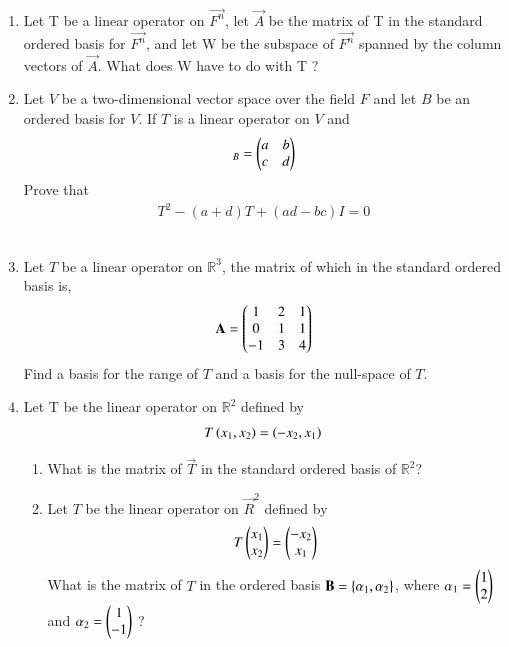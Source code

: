 \begin{enumerate}[label=\thesubsection.\arabic*.,ref=\thesubsection.\theenumi]
\item Let T be a linear operator on $\vec{F^n}$, let $\vec{A}$ be the matrix of T in the standard ordered basis for $\vec{F^n}$, and let W be the subspace of $\vec{F^n}$ spanned by the column vectors of $\vec{A}$. What does W have to do with T ?
%
\\
\solution

%
\item Let $V$ be a two-dimensional vector space over the field $F$ and let $B$ be an ordered basis for $V$. If $T$ is a linear operator on $V$ and 
\begin{align}
[T]_B = \myvec{a & b\\c & d}
\end{align}
Prove that 
\begin{align}
T^2 - (a+d)T + (ad-bc)I = 0
\end{align}
%
\\
\solution

\item Let $T$ be a linear operator on $\mathbb{R}^3$, the matrix of which in the standard ordered basis is,
\begin{align}
\mathbf{A} = \begin{pmatrix}1&2&1\\0&1&1\\-1&3&4\end{pmatrix} 
\end{align}
Find a basis for the range of $T$ and a basis for the null-space of $T$.
%
\\
\solution

\item Let T be the linear operator on $\mathbb{R}^2$ defined by
\begin{align}
T\left(x_1,x_2\right)=\left(-x_2,x_1\right)\label{eq:solutions/3/4/6/c/Tx}
\end{align}
\begin{enumerate}
\item What is the matrix of $\vec{T}$ in the standard ordered basis of $\mathbb{R}^2$?
%
\\
\solution

\item  	Let $T$ be the linear operator on $\vec{R}^2$ defined by 
	\begin{align}
		T\begin{pmatrix}x_1\\ x_2\end{pmatrix} = \begin{pmatrix}-x_2\\ x_1\end{pmatrix} 
	\end{align}
	What is the matrix of $T$ in the ordered basis $\mathbf{B} = \left\{ \mathbf{ \alpha }_1, \mathbf{\alpha}_2\right\}$, where $\mathbf{\alpha}_1 = \begin{pmatrix}1\\ 2\end{pmatrix}$ and $\mathbf{\alpha}_2 = \begin{pmatrix}1 \\ -1\end{pmatrix}$ ?

\end{enumerate}
\end{enumerate}

